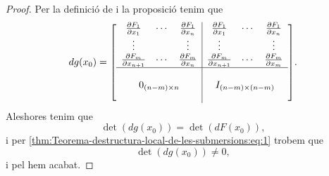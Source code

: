 \documentclass[../geometria-diferencial.tex]{subfiles}
\begin{document}
\begin{proof}
        Per la definició de  i la proposició  tenim que
        \[dg(x_{0})=\left[\begin{array}{c|c}
            \begin{matrix}
                \frac{\partial F_{1}}{\partial x_{1}} & \cdots & \frac{\partial F_{1}}{\partial x_{n}} \\
                \vdots & & \vdots \\
                \frac{\partial F_{m}}{\partial x_{n+1}} & \cdots & \frac{\partial F_{m}}{\partial x_{n}}
            \end{matrix} & \begin{matrix}
                \frac{\partial F_{1}}{\partial x_{1}} & \cdots & \frac{\partial F_{1}}{\partial x_{n}} \\
                \vdots & & \vdots \\
                \frac{\partial F_{m}}{\partial x_{n+1}} & \cdots & \frac{\partial F_{m}}{\partial x_{m}}
            \end{matrix} \\ \hline \\
            0_{(n-m)\times n} & I_{(n-m)\times(n-m)} \\
            &
        \end{array}\right].\]
        Aleshores tenim que
        \[
            \det(dg(x_{0}))=\det(dF(x_{0})),
        \]
        i per \eqref{thm:Teorema-destructura-local-de-les-submersions:eq:1} trobem que
        \[
            \det(dg(x_{0}))\neq0,
        \]
        i pel  hem acabat.
    \end{proof}
\end{document}
